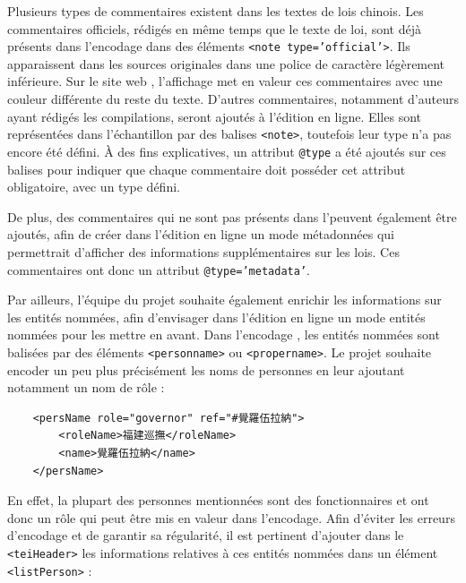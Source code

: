 Plusieurs types de commentaires existent dans les textes de lois chinois. Les commentaires officiels, rédigés en même temps que le texte de loi, sont déjà présents dans l'encodage dans des éléments \texttt{<note type='official'>}. Ils apparaissent dans les sources originales dans une police de caractère légèrement inférieure. Sur le site web \LSC, l'affichage met en valeur ces commentaires avec une couleur différente du reste du texte. D'autres commentaires, notamment d'auteurs ayant rédigés les compilations, seront ajoutés à l'édition en ligne. Elles sont représentées dans l'échantillon par des balises \texttt{<note>}, toutefois leur type n'a pas encore été défini. À des fins explicatives, un attribut \texttt{@type} a été ajoutés sur ces balises pour indiquer que chaque commentaire doit posséder cet attribut obligatoire, avec un type défini.

De plus, des commentaires qui ne sont pas présents dans l'\OCR peuvent également être ajoutés, afin de créer dans l'édition en ligne un mode \og métadonnées \fg qui permettrait d'afficher des informations supplémentaires sur les lois. Ces commentaires ont donc un attribut \texttt{@type='metadata'}. 

Par ailleurs, l'équipe du projet souhaite également enrichir les informations sur les entités nommées, afin d'envisager dans l'édition en ligne un mode \og entités nommées \fg pour les mettre en avant. Dans l'encodage \LSC, les entités nommées sont balisées par des éléments \texttt{<personname>} ou \texttt{<propername>}. Le projet \COREL souhaite encoder un peu plus précisément les noms de personnes en leur ajoutant notamment un nom de rôle : 

\begin{verbatim}
    <persName role="governor" ref="#覺羅伍拉納">
        <roleName>福建巡撫</roleName>
        <name>覺羅伍拉納</name>
    </persName>
\end{verbatim}
En effet, la plupart des personnes mentionnées sont des fonctionnaires et ont donc un rôle qui peut être mis en valeur dans l'encodage. Afin d'éviter les erreurs d'encodage et de garantir sa régularité, il est pertinent d'ajouter dans le \texttt{<teiHeader>} les informations relatives à ces entités nommées dans un élément \texttt{<listPerson>} : 


